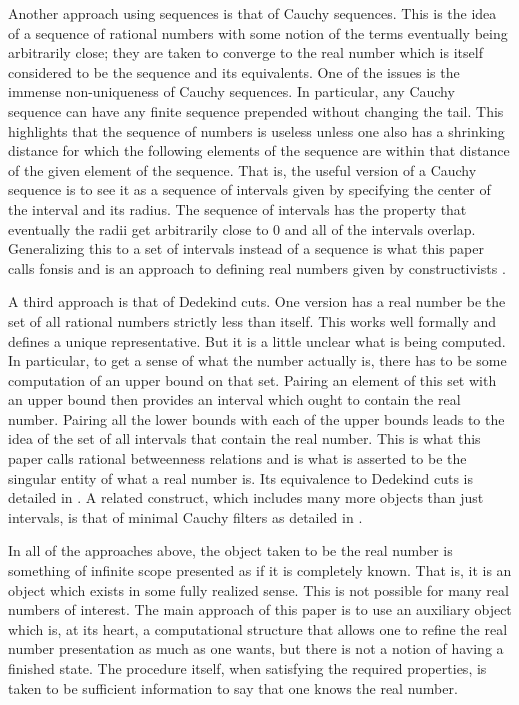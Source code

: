 \documentclass[12pt]{article}
\begin{document}
Another approach using sequences is that of Cauchy sequences. This is the idea of a sequence of rational numbers  with some notion of the terms eventually being arbitrarily close; they are taken to converge to the real number which is itself considered to be the sequence and its equivalents. One of the issues is the immense non-uniqueness of Cauchy sequences. In particular, any Cauchy sequence can have any finite sequence prepended without changing the tail. This highlights that the sequence of numbers is useless unless one also has a shrinking distance  for which the following elements of the sequence are within that distance of the given element of the sequence. That is, the useful version of a Cauchy sequence is to see it as a sequence of intervals given by specifying the center of the interval and its radius. The sequence of intervals has the property that eventually the radii get arbitrarily close to 0 and all of the intervals overlap. Generalizing this to a set of intervals instead of a sequence is what this paper calls fonsis and is an approach to defining real numbers given by constructivists \cite{bridger}.

A third approach is that of Dedekind cuts. One version has a real number be the set of all rational numbers strictly less than itself. This works well formally and defines a unique representative. But it is a little unclear what is being computed. In particular, to get a sense of what the number actually is, there has to be some computation of an upper bound on that set. Pairing an element of this set with an upper bound then provides an interval which ought to contain the real number. Pairing all the lower bounds with each of the upper bounds leads to the idea of the set of all intervals that contain the real number. This is what this paper calls rational betweenness relations and is what is asserted to be the singular entity of what a real number is. Its equivalence to Dedekind cuts is detailed in \cite{taylor24dedekind}. A related construct, which includes many more objects than just intervals, is that of minimal Cauchy filters as detailed in \cite{ittay-2015}.

In all of the approaches above, the object taken to be the real number is something of infinite scope presented as if it is completely known. That is, it is an object which exists in some fully realized sense. This is not possible for many real numbers of interest. The main approach of this paper is to use an auxiliary object which is, at its heart, a computational structure that allows one to refine the real number presentation as much as one wants, but there is not a notion of having a finished state. The procedure itself, when satisfying the required properties, is taken to be sufficient information to say that one knows the real number. 
\end{document}
